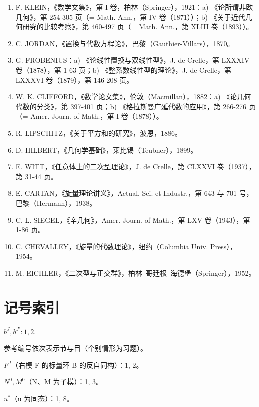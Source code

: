 \begin{enumerate}
  E. BELTRAMI：a) 《非欧几何解释试论》，Giorn. di Mat.，第 VI 卷（1868），第 284–312 页；b) 《常曲率空间的基本理论》，Ann. di Mat. (2)，第 II 卷（1868–69），第 232–255 页。
\item
  F. KLEIN，《数学文集》，第 I 卷，柏林（Springer），1921：a) 《论所谓非欧几何》，第 254-305 页（= Math. Ann.，第 IV 卷（1871））；b) 《关于近代几何研究的比较考察》，第 460-497 页（= Math. Ann.，第 XLIII 卷（1893））。
\item
  C. JORDAN，《置换与代数方程论》，巴黎（Gauthier-Villars），1870。
\item
  G. FROBENIUS：a) 《论线性置换与双线性型》，J. de Crelle，第 LXXXIV 卷（1878），第 1-63 页；b) 《整系数线性型的理论》，J. de Crelle，第 LXXXVI 卷（1879），第 146-208 页。
\item
  W. K. CLIFFORD，《数学论文集》，伦敦（Macmillan），1882：a) 《论几何代数的分类》，第 397-401 页；b) 《格拉斯曼广延代数的应用》，第 266-276 页（= Amer. Journ. of Math.，第 I 卷（1878））。
\item
  R. LIPSCHITZ，《关于平方和的研究》，波恩，1886。
\item
  D. HILBERT，《几何学基础》，莱比锡（Teubner），1899。
\item
  E. WITT，《任意体上的二次型理论》，J. de Crelle，第 CLXXVI 卷（1937），第 31-44 页。
\item
  E. CARTAN，《旋量理论讲义》，Actual. Sci. et Industr.，第 643 与 701 号，巴黎（Hermann），1938。
\item
  C. L. SIEGEL，《辛几何》，Amer. Journ. of Math.，第 LXV 卷（1943），第 1-86 页。
\item
  C. CHEVALLEY，《旋量的代数理论》，纽约（Columbia Univ. Press），1954。
\item
  M. EICHLER，《二次型与正交群》，柏林–哥廷根–海德堡（Springer），1952。
\end{enumerate}

\chapter*{记号索引}
{}

\(b^{J}, b^{J'} : 1, 2.\)

参考编号依次表示节与目（个别情形为习题）。

\(F^{J}\)（右模 F 的标量环 B 的反自同构）：1, 2。

\(N^{0}, M^{0}\)（N、M 为子模）：1, 3。

\(u^{*}\)（u 为同态）：1, 8。

